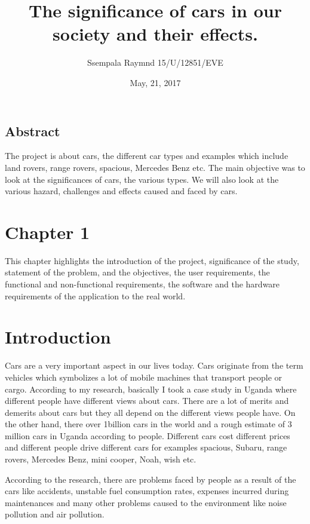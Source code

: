 \documentclass[12]{article}
\begin{document}
\title{The significance of cars in our society and their effects.}
\author{Ssempala Raymnd 15/U/12851/EVE}
\date{May, 21, 2017}
\maketitle

\newpage
\tableofcontents


\subsection{Abstract}
The project is about cars, the different car types and examples which include land rovers, range rovers, spacious, Mercedes Benz etc. 
The main objective was to look at the significances of cars, the various types. We will also look at the various hazard, challenges and effects caused and faced by cars.

\section{Chapter 1}
This chapter highlights the introduction of the project, significance of the study, statement of the problem, and the objectives, the user requirements, the functional and non-functional requirements, the software and the hardware requirements of the application to the real world.

\section{Introduction}
Cars are a very important aspect in our lives today. Cars originate from the term vehicles which symbolizes a lot of mobile machines that transport people or cargo. According to my research, basically I took a case study in Uganda where different people have different views about cars. There are a lot of merits and demerits about cars but they all depend on the different views people have.
On the other hand, there over 1billion cars in the world and a rough estimate of 3 million cars in Uganda according to people.  Different cars cost different prices and different people drive different cars for examples spacious, Subaru, range rovers, Mercedes Benz, mini cooper, Noah, wish etc. 

According to the research, there are problems faced by people as a result of the cars like accidents, unstable fuel consumption rates, expenses incurred during maintenances and many other problems caused to the environment like noise pollution and air pollution.
\end{document}

